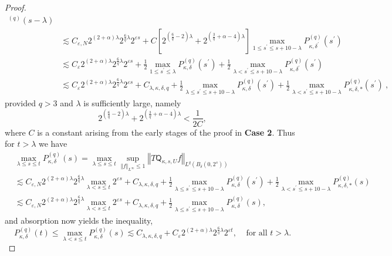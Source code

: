 \documentclass{amsart}%
\theoremstyle{plain}
\numberwithin{equation}{section}
\begin{document}
\begin{proof}
\begin{align*}
{}^{\left(  q\right)  }\left(  s-\lambda\right) \\
&  \lesssim C_{\varepsilon,N}2^{\left(  2+\alpha\right)  \lambda}2^{\frac
{6}{q}\lambda}2^{\varepsilon s}+C\left[  2^{\left(  \frac{6}{q}-2\right)
\lambda}+2^{\left(  \frac{3}{q}+\alpha-4\right)  \lambda}\right]  \max_{1\leq
s^{\prime}\leq s+10-\lambda}P_{\kappa,\delta^{\prime}}^{\left(  q\right)
}\left(  s^{\prime}\right) \\
&  \lesssim C_{\varepsilon}2^{\left(  2+\alpha\right)  \lambda}2^{\frac{6}%
{q}\lambda}2^{\varepsilon s}+\frac{1}{2}\max_{1\leq s^{\prime}\leq\lambda
}P_{\kappa,\delta}^{\left(  q\right)  }\left(  s^{\prime}\right)  +\frac{1}%
{2}\max_{\lambda<s^{\prime}\leq s+10-\lambda}P_{\kappa,\delta^{\prime}%
}^{\left(  q\right)  }\left(  s^{\prime}\right) \\
&  \lesssim C_{\varepsilon}2^{\left(  2+\alpha\right)  \lambda}2^{\frac{6}%
{q}\lambda}2^{\varepsilon s}+C_{\lambda,\kappa,\delta,q}+\frac{1}{2}%
\max_{\lambda\leq s^{\prime}\leq s+10-\lambda}P_{\kappa,\delta}^{\left(
q\right)  }\left(  s^{\prime}\right)  +\frac{1}{2}\max_{\lambda<s^{\prime}\leq
s+10-\lambda}P_{\kappa,\delta,\ast}^{\left(  q\right)  }\left(  s^{\prime
}\right)  \ ,
\end{align*}
provided $q>3$ and $\lambda$ is sufficiently large, namely%
\begin{equation}
2^{\left(  \frac{6}{q}-2\right)  \lambda}+2^{\left(  \frac{3}{q}%
+\alpha-4\right)  \lambda}<\frac{1}{2C},\label{namely}%
\end{equation}
where $C$ is a constant arising from the early stages of the proof in
\textbf{Case 2}. Thus for $t>\lambda$ we have%
\begin{align*}
&  \max_{\lambda\leq s\leq t}P_{\kappa,\delta}^{\left(  q\right)  }\left(
s\right)  =\max_{\lambda\leq s\leq t}\sup_{\left\Vert f\right\Vert
_{L^{\infty}}\leq1}\left\Vert T\mathsf{Q}_{\kappa,s,U}f\right\Vert
_{L^{q}\left(  B_{\delta}\left(  0,2^{s}\right)  \right)  }\\
&  \lesssim C_{\varepsilon,N}2^{\left(  2+\alpha\right)  \lambda}2^{\frac
{6}{q}\lambda}\max_{\lambda<s\leq t}2^{\varepsilon s}+C_{\lambda,\kappa
,\delta,q}+\frac{1}{2}\max_{\lambda\leq s^{\prime}\leq s+10-\lambda}%
P_{\kappa,\delta}^{\left(  q\right)  }\left(  s^{\prime}\right)  +\frac{1}%
{2}\max_{\lambda<s^{\prime}\leq s+10-\lambda}P_{\kappa,\delta,\ast}^{\left(
q\right)  }\left(  s\right) \\
&  \lesssim C_{\varepsilon,N}2^{\left(  2+\alpha\right)  \lambda}2^{\frac
{6}{q}\lambda}\max_{\lambda<s\leq t}2^{\varepsilon s}+C_{\lambda,\kappa
,\delta,q}+\frac{1}{2}\max_{\lambda\leq s^{\prime}\leq s+10-\lambda}%
P_{\kappa,\delta}^{\left(  q\right)  }\left(  s\right)  ,
\end{align*}
and absorption now yields the inequality,%
\[
P_{\kappa,\delta}^{\left(  q\right)  }\left(  t\right)  \leq\max
_{\lambda<s\leq t}P_{\kappa,\delta}^{\left(  q\right)  }\left(  s\right)
\lesssim C_{\lambda,\kappa,\delta,q}+C_{\varepsilon}2^{\left(  2+\alpha
\right)  \lambda}2^{\frac{6}{q}\lambda}2^{\varepsilon t},\ \ \ \ \ \text{for
all }t>\lambda.
\]



\end{proof}
\end{document}
